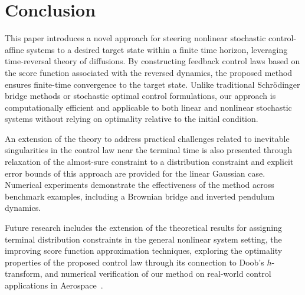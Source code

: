 \documentclass[letterpaper, 10 pt, conference]{ieeeconf}  %
\begin{document}
{
\section{Conclusion}

This paper introduces a novel approach for steering nonlinear stochastic control-affine systems to a desired target state within a finite time horizon, leveraging time-reversal theory of diffusions. By constructing feedback control laws based on the score function associated with the reversed dynamics, the proposed method ensures finite-time convergence to the target state. Unlike traditional Schr\"{o}dinger bridge methods or stochastic optimal control formulations, our approach is computationally efficient and applicable to both linear and nonlinear stochastic systems without relying on optimality relative to the initial condition.

An extension of the theory to address practical challenges related to inevitable singularities in the control law near the terminal time is also presented through relaxation of the almost-sure constraint to a distribution constraint and explicit error bounds of this approach are provided for the linear Gaussian case. Numerical experiments demonstrate the effectiveness of the method across benchmark examples, including a Brownian bridge and inverted pendulum dynamics. 

Future research includes the extension of the theoretical results for assigning terminal distribution constraints in the general nonlinear system setting, the improving score function approximation techniques,  exploring the optimality properties of the proposed control law through its connection to Doob's $h$-transform, and numerical verification of our method on real-world control applications in Aerospace~\cite{exarchos2019optimal,lew2020chance}.





}

% 

    
    

\end{document}
